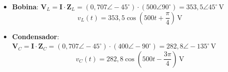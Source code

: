 \begin{ejemplo}
\begin{enumerate}
\begin{itemize}
\begin{equation*}
            \boxed{v_R(t) = 70{,}7\cos\left(500 t - \frac{\pi}{4}\right)\,\si{\volt}}
        \end{equation*}
        \item \textbf{Bobina}: $\mathbf{V}_L = \mathbf{I}\cdot\mathbf{Z}_L = (0{,}707\angle -45^\circ)\cdot(500\angle 90^\circ) = 353{,}5\angle 45^\circ\,\si{\volt}$
        \begin{equation*}
            \boxed{v_L(t) = 353{,}5\cos\left(500 t + \frac{\pi}{4}\right)\,\si{\volt}}
        \end{equation*}
        \item \textbf{Condensador}: $\mathbf{V}_C = \mathbf{I}\cdot\mathbf{Z}_C = (0{,}707\angle -45^\circ)\cdot(400\angle -90^\circ) = 282{,}8\angle -135^\circ\,\si{\volt}$
        \begin{equation*}
            \boxed{v_C(t) = 282{,}8\cos\left(500 t - \frac{3\pi}{4}\right)\,\si{\volt}}
        \end{equation*}
    \end{itemize}
\end{enumerate}
\end{ejemplo}

